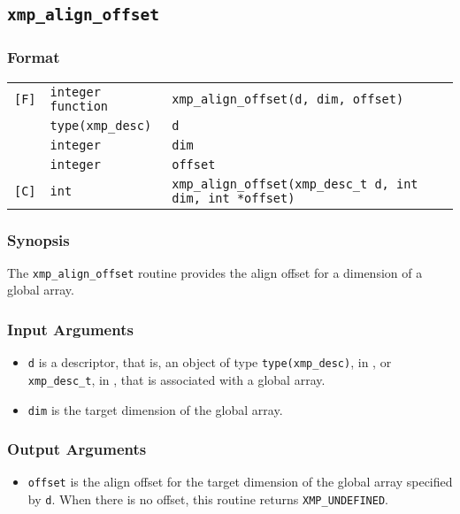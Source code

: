 \subsection{\tt xmp\_align\_offset}

\subsubsection*{Format}

\begin{tabular}{lll}

\verb![F]!& {\tt integer function}& {\tt xmp\_align\_offset(d, dim, offset)}\\
          & {\tt type(xmp\_desc)} & {\tt d}\\
          & {\tt integer} & {\tt dim}\\
          & {\tt integer} & {\tt offset}\\

\verb![C]!&  {\tt int}& {\tt xmp\_align\_offset(xmp\_desc\_t d, int dim, int *offset)}\\

\end{tabular}

\subsubsection*{Synopsis}

The {\tt xmp\_align\_offset} routine provides the align offset for a
dimension of a global array.

\subsubsection*{Input Arguments}
\begin{itemize}
 \item {\tt d} is a descriptor, that is, an object of type 
       {\tt type(xmp\_desc)}, in {\XMPF}, or {\tt xmp\_desc\_t},
       in {\XMPC}, that is associated with a global array.
 \item {\tt dim} is the target dimension of the global array.
\end{itemize}

\subsubsection*{Output Arguments}
\begin{itemize}
 \item {\tt offset} is the align offset for the target dimension of the
       global array specified by {\tt d}. When there is no offset, this
       routine returns {\tt XMP\_UNDEFINED}.
\end{itemize}


